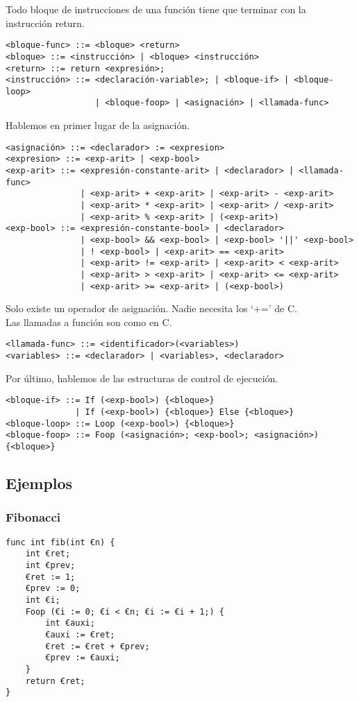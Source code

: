 \documentclass[spanish, a4paper, 12pt] {article}
\begin{document}
Todo bloque de instrucciones de una función tiene que terminar con la instrucción return.
\begin{verbatim}
<bloque-func> ::= <bloque> <return>
<bloque> ::= <instrucción> | <bloque> <instrucción>
<return> ::= return <expresión>;
<instrucción> ::= <declaración-variable>; | <bloque-if> | <bloque-loop>
                  | <bloque-foop> | <asignación> | <llamada-func>
\end{verbatim}
Hablemos en primer lugar de la asignación.
\begin{verbatim}
<asignación> ::= <declarador> := <expresion>
<expresion> ::= <exp-arit> | <exp-bool>
<exp-arit> ::= <expresión-constante-arit> | <declarador> | <llamada-func>
               | <exp-arit> + <exp-arit> | <exp-arit> - <exp-arit>
               | <exp-arit> * <exp-arit> | <exp-arit> / <exp-arit>
               | <exp-arit> % <exp-arit> | (<exp-arit>)
<exp-bool> ::= <expresión-constante-bool> | <declarador>
               | <exp-bool> && <exp-bool> | <exp-bool> '||' <exp-bool>
               | ! <exp-bool> | <exp-arit> == <exp-arit>
               | <exp-arit> != <exp-arit> | <exp-arit> < <exp-arit>
               | <exp-arit> > <exp-arit> | <exp-arit> <= <exp-arit>
               | <exp-arit> >= <exp-arit> | (<exp-bool>)
\end{verbatim}
Solo existe un operador de asignación. Nadie necesita los `+=' de C.\\

Las llamadas a función son como en C.
\begin{verbatim}
<llamada-func> ::= <identificador>(<variables>)
<variables> ::= <declarador> | <variables>, <declarador>
\end{verbatim}
Por último, hablemos de las estructuras de control de ejecución.
\begin{verbatim}
<bloque-if> ::= If (<exp-bool>) {<bloque>}
              | If (<exp-bool>) {<bloque>} Else {<bloque>}
<bloque-loop> ::= Loop (<exp-bool>) {<bloque>}
<bloque-foop> ::= Foop (<asignación>; <exp-bool>; <asignación>) {<bloque>}
\end{verbatim}
\subsection*{Ejemplos}
\subsubsection*{Fibonacci}
\begin{verbatim}
func int fib(int €n) {
    int €ret;
    int €prev;
    €ret := 1;
    €prev := 0;
    int €i;
    Foop (€i := 0; €i < €n; €i := €i + 1;) {
        int €auxi;
        €auxi := €ret;
        €ret := €ret + €prev;
        €prev := €auxi;
    }
    return €ret;
}
\end{verbatim}
\end{document}
